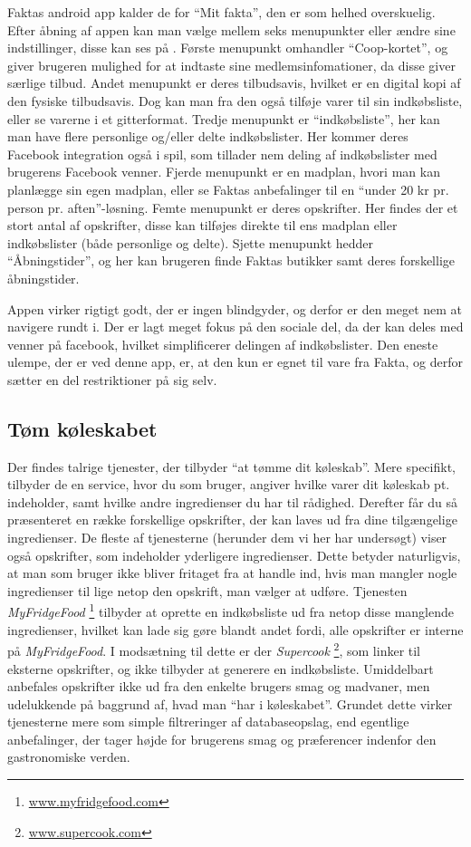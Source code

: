 Faktas android app kalder de for ``Mit fakta'', den er som helhed overskuelig.
Efter åbning af appen kan man vælge mellem seks menupunkter eller ændre sine indstillinger, disse kan ses på .
Første menupunkt omhandler ``Coop-kortet'', og giver brugeren mulighed for at indtaste sine medlemsinfomationer, da disse giver særlige tilbud.
Andet menupunkt er deres tilbudsavis, hvilket er en digital kopi af den fysiske tilbudsavis.
Dog kan man fra den også tilføje varer til sin indkøbsliste, eller se varerne i et gitterformat.
Tredje menupunkt er ``indkøbsliste'', her kan man have flere personlige og/eller delte indkøbslister.
Her kommer deres Facebook integration også i spil, som tillader nem deling af indkøbslister med brugerens Facebook venner.
Fjerde menupunkt er en madplan, hvori man kan planlægge sin egen madplan, eller se Faktas anbefalinger til en ``under 20 kr pr. person pr. aften''-løsning.
Femte menupunkt er deres opskrifter.
Her findes der et stort antal af opskrifter, disse kan tilføjes direkte til ens madplan eller indkøbslister (både personlige og delte).
Sjette menupunkt hedder ``Åbningstider'', og her kan brugeren finde Faktas butikker samt deres forskellige åbningstider.

Appen virker rigtigt godt, der er ingen blindgyder, og derfor er den meget nem at navigere rundt i. Der er lagt meget fokus på den sociale del, da der kan deles med venner på facebook, hvilket simplificerer delingen af indkøbslister. Den eneste ulempe, der er ved denne app, er, at den kun er egnet til vare fra Fakta, og derfor sætter en del restriktioner på sig selv.

\subsection{Tøm køleskabet}
Der findes talrige tjenester, der tilbyder ``at tømme dit køleskab''.
Mere specifikt, tilbyder de en service, hvor du som bruger, angiver hvilke varer dit køleskab pt. indeholder, samt hvilke andre ingredienser du har til rådighed.
Derefter får du så præsenteret en række forskellige opskrifter, der kan laves ud fra dine tilgængelige ingredienser.
De fleste af tjenesterne (herunder dem vi her har undersøgt) viser også opskrifter, som indeholder yderligere ingredienser.
Dette betyder naturligvis, at man som bruger ikke bliver fritaget fra at handle ind, hvis man mangler nogle ingredienser til lige netop den opskrift, man vælger at udføre.
Tjenesten \textit{MyFridgeFood} \footnote{\underline{www.myfridgefood.com}} tilbyder at oprette en indkøbsliste ud fra netop disse manglende ingredienser, hvilket kan lade sig gøre blandt andet fordi, alle opskrifter er interne på \textit{MyFridgeFood}.
I modsætning til dette er der \textit{Supercook} \footnote{\underline{www.supercook.com}}, som linker til eksterne opskrifter, og ikke tilbyder at generere en indkøbsliste.
Umiddelbart anbefales opskrifter ikke ud fra den enkelte brugers smag og madvaner, men udelukkende på baggrund af, hvad man ``har i køleskabet''.
Grundet dette virker tjenesterne mere som simple filtreringer af databaseopslag, end egentlige anbefalinger, der tager højde for brugerens smag og præferencer indenfor den gastronomiske verden.

